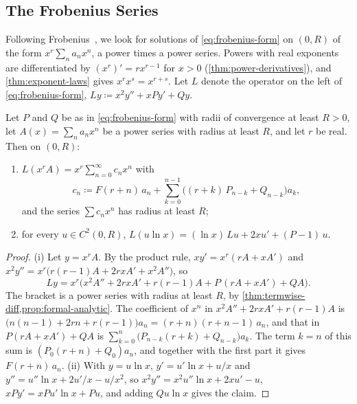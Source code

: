 \subsection{The Frobenius Series}

Following Frobenius~\cite{frobenius1873}, we look for solutions of \eqref{eq:frobenius-form} on $(0,R)$ of the form $x^r\sum_na_nx^n$, a power times a power series. Powers with real exponents are differentiated by $(x^r)'=rx^{r-1}$ for $x>0$ (\cref{thm:power-derivatives}), and \cref{thm:exponent-laws} gives $x^rx^s=x^{r+s}$. Let $L$ denote the operator on the left of \eqref{eq:frobenius-form}, $Ly\coloneqq x^2y''+xPy'+Qy$.

\begin{lemma}
\label{lem:frobenius-substitution}
Let $P$ and $Q$ be as in \eqref{eq:frobenius-form} with radii of convergence at least $R>0$, let $A(x)=\sum_na_nx^n$ be a power series with radius at least $R$, and let $r$ be real. Then on $(0,R)$:
\begin{enumerate}
\item $L(x^rA)=x^r\sum_{n=0}^\infty c_nx^n$ with
\[
c_n\coloneqq F(r+n)\,a_n+\sum_{k=0}^{n-1}\bigl((r+k)\,P_{n-k}+Q_{n-k}\bigr)a_k ,
\]
and the series $\sum c_nx^n$ has radius at least $R$;
\item for every $u\in C^2(0,R)$, $L(u\ln x)=(\ln x)\,Lu+2xu'+(P-1)\,u$.
\end{enumerate}
\end{lemma}

\begin{proof}
(i) Let $y=x^rA$. By the product rule, $xy'=x^r(rA+xA')$ and $x^2y''=x^r\bigl(r(r-1)A+2rxA'+x^2A''\bigr)$, so
\[
Ly=x^r\bigl(x^2A''+2rxA'+r(r-1)A+P\,(rA+xA')+QA\bigr).
\]
The bracket is a power series with radius at least $R$, by \cref{thm:termwise-diff,prop:formal-analytic}. The coefficient of $x^n$ in $x^2A''+2rxA'+r(r-1)A$ is $\bigl(n(n-1)+2rn+r(r-1)\bigr)a_n=(r+n)(r+n-1)\,a_n$, and that in $P(rA+xA')+QA$ is $\sum_{k=0}^n\bigl(P_{n-k}(r+k)+Q_{n-k}\bigr)a_k$. The term $k=n$ of this sum is $(P_0(r+n)+Q_0)a_n$, and together with the first part it gives $F(r+n)\,a_n$. (ii) With $y=u\ln x$, $y'=u'\ln x+u/x$ and $y''=u''\ln x+2u'/x-u/x^2$, so $x^2y''=x^2u''\ln x+2xu'-u$, $xPy'=xPu'\ln x+Pu$, and adding $Qu\ln x$ gives the claim.
\end{proof}

